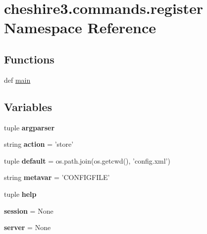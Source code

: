\hypertarget{namespacecheshire3_1_1commands_1_1register}{\section{cheshire3.\-commands.\-register Namespace Reference}
\label{namespacecheshire3_1_1commands_1_1register}
}
\subsection*{Functions}
\begin{DoxyCompactItemize}
\item 
def \hyperlink{namespacecheshire3_1_1commands_1_1register_a86791899e9e8a2c8750b7d1296c99278}{main}
\end{DoxyCompactItemize}
\subsection*{Variables}
\begin{DoxyCompactItemize}
\item 
tuple {\bfseries argparser}
\item 
\hypertarget{namespacecheshire3_1_1commands_1_1register_a909c434df4e820e2c4df533a7c237580}{string {\bfseries action} = 'store'}\label{namespacecheshire3_1_1commands_1_1register_a909c434df4e820e2c4df533a7c237580}

\item 
\hypertarget{namespacecheshire3_1_1commands_1_1register_a5e57e08ce8f363d360de36bba04bc120}{tuple {\bfseries default} = os.\-path.\-join(os.\-getcwd(), 'config.\-xml')}\label{namespacecheshire3_1_1commands_1_1register_a5e57e08ce8f363d360de36bba04bc120}

\item 
\hypertarget{namespacecheshire3_1_1commands_1_1register_a8bdfbad90a7431091ffb3cbe152a9f25}{string {\bfseries metavar} = 'C\-O\-N\-F\-I\-G\-F\-I\-L\-E'}\label{namespacecheshire3_1_1commands_1_1register_a8bdfbad90a7431091ffb3cbe152a9f25}

\item 
tuple {\bfseries help}
\item 
\hypertarget{namespacecheshire3_1_1commands_1_1register_aecac114cea674c1714b7600f2d5fc9ea}{{\bfseries session} = None}\label{namespacecheshire3_1_1commands_1_1register_aecac114cea674c1714b7600f2d5fc9ea}

\item 
\hypertarget{namespacecheshire3_1_1commands_1_1register_afe68553ea651cec898e7e539e9de95cd}{{\bfseries server} = None}\label{namespacecheshire3_1_1commands_1_1register_afe68553ea651cec898e7e539e9de95cd}

\end{DoxyCompactItemize}


